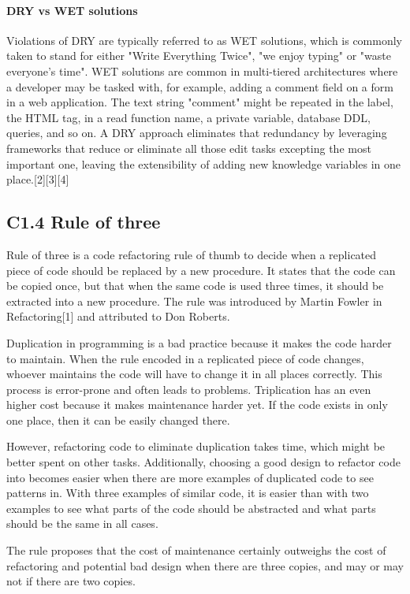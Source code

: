 \documentclass{book}
\begin{document}
\paragraph{DRY vs WET solutions}
Violations of DRY are typically referred to as WET solutions, which is commonly taken to stand for either "Write Everything Twice", "we enjoy typing" or "waste everyone's time".
WET solutions are common in multi-tiered architectures where a developer may be tasked with, for example, adding a comment field on a form in a web application.
The text string "comment" might be repeated in the label, the HTML tag, in a read function name, a private variable, database DDL, queries, and so on.
A DRY approach eliminates that redundancy by leveraging frameworks that reduce or eliminate all those edit tasks excepting the most important one,
leaving the extensibility of adding new knowledge variables in one place.[2][3][4]
\subsection{C1.4 Rule of three}\label{ROT}
Rule of three is a code refactoring rule of thumb to decide when a replicated piece of code should be replaced by a new procedure.
It states that the code can be copied once, but that when the same code is used three times, it should be extracted into a new procedure.
The rule was introduced by Martin Fowler in Refactoring[1] and attributed to Don Roberts.

Duplication in programming is a bad practice because it makes the code harder to maintain.
When the rule encoded in a replicated piece of code changes, whoever maintains the code will have to change it in all places correctly.
This process is error-prone and often leads to problems.
Triplication has an even higher cost because it makes maintenance harder yet.
If the code exists in only one place, then it can be easily changed there.

However, refactoring code to eliminate duplication takes time, which might be better spent on other tasks.
Additionally, choosing a good design to refactor code into becomes easier when there are more examples of duplicated code to see patterns in.
With three examples of similar code, it is easier than with two examples to see what parts of the code should be abstracted and what parts should be the same in all cases.

The rule proposes that the cost of maintenance certainly outweighs the cost of refactoring and potential bad design when there are three copies, and may or may not if there are two copies.
\end{document}
